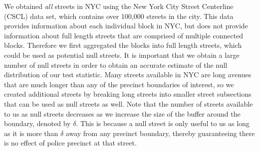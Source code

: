 \documentclass[a4paper,11pt]{article}
\begin{document}


We obtained \textit{all} streets in NYC using the New York City Street Centerline (CSCL) data set, which contains over 100,000 streets in the city. This data provides information about each individual block in NYC, but does not provide information about full length streets that are comprised of multiple connected blocks. Therefore we first aggregated the blocks into full length streets, which could be used as potential null streets. It is important that we obtain a large number of null streets in order to obtain an accurate estimate of the null distribution of our test statistic. Many streets available in NYC are long avenues that are much longer than any of the precinct boundaries of interest, so we created additional streets by breaking long streets into smaller street subsections that can be used as null streets as well. Note that the number of streets available to us as null streets decreases as we increase the size of the buffer around the boundary, denoted by $\delta$. This is because a null street is only useful to us as long as it is more than $\delta$ away from any precinct boundary, thereby guaranteeing there is no effect of police precinct at that street. 
\end{document}
